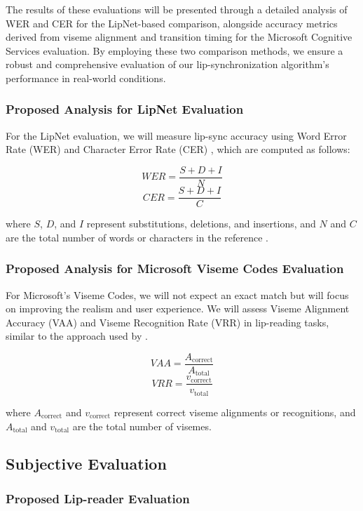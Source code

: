 \documentclass[12pt]{article}
\begin{document}
The results of these evaluations will be presented through a detailed analysis of WER and CER for the LipNet-based comparison, alongside accuracy metrics derived from viseme alignment and transition timing for the Microsoft Cognitive Services evaluation. By employing these two comparison methods, we ensure a robust and comprehensive evaluation of our lip-synchronization algorithm’s performance in real-world conditions.

\subsubsection{Proposed Analysis for LipNet Evaluation}

For the LipNet evaluation, we will measure lip-sync accuracy using Word Error Rate (WER) and Character Error Rate (CER) \cite{KLAKOW200219}, which are computed as follows:

\[
WER = \frac{S + D + I}{N}
\]
\[
CER = \frac{S + D + I}{C}
\]

where $S$, $D$, and $I$ represent substitutions, deletions, and insertions, and $N$ and $C$ are the total number of words or characters in the reference \cite{assael2016lipnet, fan2022faceformer}.

\subsubsection{Proposed Analysis for Microsoft Viseme Codes Evaluation}

For Microsoft’s Viseme Codes, we will not expect an exact match but will focus on improving the realism and user experience. We will assess Viseme Alignment Accuracy (VAA) and Viseme Recognition Rate (VRR) in lip-reading tasks, similar to the approach used by \cite{Fenghour2022}.

\[
VAA = \frac{A_{\text{correct}}}{A_{\text{total}}}
\]
\[
VRR = \frac{v_{\text{correct}}}{v_{\text{total}}}
\]

where $A_{\text{correct}}$ and $v_{\text{correct}}$ represent correct viseme alignments or recognitions, and $A_{\text{total}}$ and $v_{\text{total}}$ are the total number of visemes.

\subsection{Subjective Evaluation}
\subsubsection{Proposed Lip-reader Evaluation}
\end{document}
